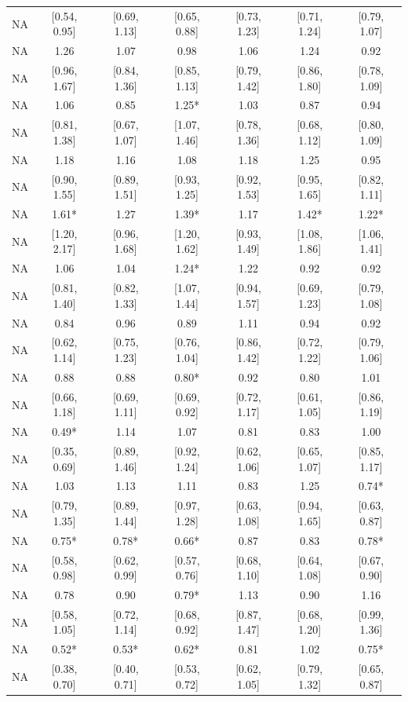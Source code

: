\documentclass[man]{apa6}
\begin{document}
\begin{center}
\begin{ThreePartTable}
{\begin{longtable}{lcccccc}
NA & [0.54, 0.95] & [0.69, 1.13] & [0.65, 0.88] & [0.73, 1.23] & [0.71, 1.24] & [0.79, 1.07]\\
NA & 1.26 & 1.07 & 0.98 & 1.06 & 1.24 & 0.92\\
NA & [0.96, 1.67] & [0.84, 1.36] & [0.85, 1.13] & [0.79, 1.42] & [0.86, 1.80] & [0.78, 1.09]\\
NA & 1.06 & 0.85 & 1.25* & 1.03 & 0.87 & 0.94\\
NA & [0.81, 1.38] & [0.67, 1.07] & [1.07, 1.46] & [0.78, 1.36] & [0.68, 1.12] & [0.80, 1.09]\\
NA & 1.18 & 1.16 & 1.08 & 1.18 & 1.25 & 0.95\\
NA & [0.90, 1.55] & [0.89, 1.51] & [0.93, 1.25] & [0.92, 1.53] & [0.95, 1.65] & [0.82, 1.11]\\
NA & 1.61* & 1.27 & 1.39* & 1.17 & 1.42* & 1.22*\\
NA & [1.20, 2.17] & [0.96, 1.68] & [1.20, 1.62] & [0.93, 1.49] & [1.08, 1.86] & [1.06, 1.41]\\
NA & 1.06 & 1.04 & 1.24* & 1.22 & 0.92 & 0.92\\
NA & [0.81, 1.40] & [0.82, 1.33] & [1.07, 1.44] & [0.94, 1.57] & [0.69, 1.23] & [0.79, 1.08]\\
NA & 0.84 & 0.96 & 0.89 & 1.11 & 0.94 & 0.92\\
NA & [0.62, 1.14] & [0.75, 1.23] & [0.76, 1.04] & [0.86, 1.42] & [0.72, 1.22] & [0.79, 1.06]\\
NA & 0.88 & 0.88 & 0.80* & 0.92 & 0.80 & 1.01\\
NA & [0.66, 1.18] & [0.69, 1.11] & [0.69, 0.92] & [0.72, 1.17] & [0.61, 1.05] & [0.86, 1.19]\\
NA & 0.49* & 1.14 & 1.07 & 0.81 & 0.83 & 1.00\\
NA & [0.35, 0.69] & [0.89, 1.46] & [0.92, 1.24] & [0.62, 1.06] & [0.65, 1.07] & [0.85, 1.17]\\
NA & 1.03 & 1.13 & 1.11 & 0.83 & 1.25 & 0.74*\\
NA & [0.79, 1.35] & [0.89, 1.44] & [0.97, 1.28] & [0.63, 1.08] & [0.94, 1.65] & [0.63, 0.87]\\
NA & 0.75* & 0.78* & 0.66* & 0.87 & 0.83 & 0.78*\\
NA & [0.58, 0.98] & [0.62, 0.99] & [0.57, 0.76] & [0.68, 1.10] & [0.64, 1.08] & [0.67, 0.90]\\
NA & 0.78 & 0.90 & 0.79* & 1.13 & 0.90 & 1.16\\
NA & [0.58, 1.05] & [0.72, 1.14] & [0.68, 0.92] & [0.87, 1.47] & [0.68, 1.20] & [0.99, 1.36]\\
NA & 0.52* & 0.53* & 0.62* & 0.81 & 1.02 & 0.75*\\
NA & [0.38, 0.70] & [0.40, 0.71] & [0.53, 0.72] & [0.62, 1.05] & [0.79, 1.32] & [0.65, 0.87]\\
\bottomrule
\end{longtable}
}
\end{ThreePartTable}
\end{center}
\end{document}

